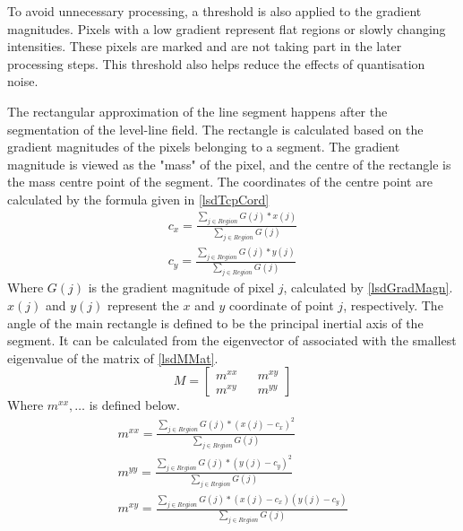 To avoid unnecessary processing, a threshold is also applied to the gradient magnitudes.
Pixels with a low gradient represent flat regions or slowly changing intensities.
These pixels are marked and are not taking part in the later processing steps.
This threshold also helps reduce the effects of quantisation noise.	

The rectangular approximation of the line segment happens after the segmentation of the level-line field.
The rectangle is calculated based on the gradient magnitudes of the pixels belonging to a segment.
The gradient magnitude is viewed as the "mass"\cite{LSDDet} of the pixel, and the centre of the rectangle is the mass centre point of the segment.
The coordinates of the centre point are calculated by the formula given in \eqref{lsdTcpCord}
\begin{equation}
	\begin{split}
		c_x = \frac{\sum_{j \in Region} G(j) * x(j)}{\sum_{j \in Region} G(j)} \\
		c_y = \frac{\sum_{j \in Region} G(j) * y(j)}{\sum_{j \in Region} G(j)}
	\end{split}
	\label{eq:lsdTcpCord}
\end{equation}
Where $G(j)$ is the gradient magnitude of pixel $j$, calculated by \eqref{lsdGradMagn}.
$x(j)$ and $y(j)$ represent the $x$ and $y$ coordinate of point $j$, respectively.
The angle of the main rectangle is defined to be the principal inertial axis of the segment.
It can be calculated from the eigenvector of associated with the smallest eigenvalue of the matrix of \eqref{lsdMMat}.\cite{LSDDet}
\begin{equation}
	M =
	\begin{bmatrix}
		m^{xx} && m^{xy} \\
		m^{xy} && m^{yy}
	\end{bmatrix}
	\label{eq:lsdMMat}
\end{equation}
Where $m^{xx}, \dots$ is defined below.
\begin{equation}
	\begin{split}
		m^{xx} = \frac{\sum_{j \in Region} G(j) * (x(j) - c_x)^2}{\sum_{j \in Region} G(j)} \\
		m^{yy} = \frac{\sum_{j \in Region} G(j) * (y(j) - c_y)^2}{\sum_{j \in Region} G(j)} \\
		m^{xy} = \frac{\sum_{j \in Region} G(j) * (x(j) - c_x)(y(j) - c_y)}{\sum_{j \in Region} G(j)}
	\end{split}
\end{equation}

